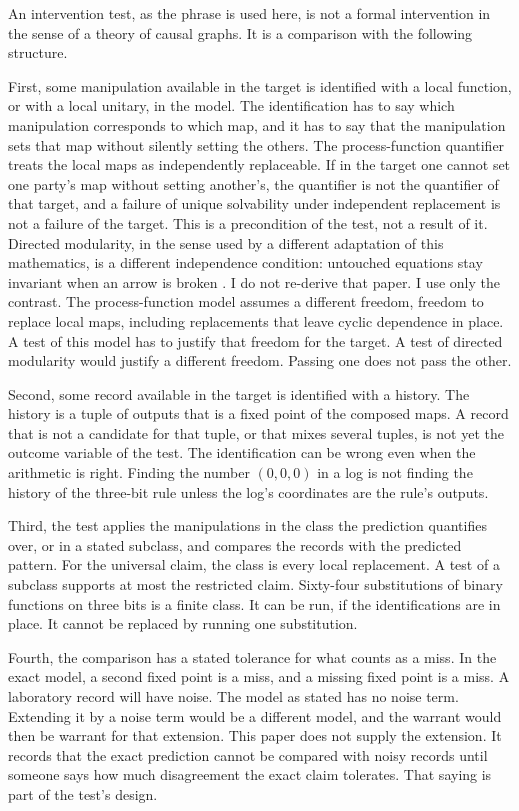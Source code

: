 \documentclass[11pt]{article}
\begin{document}
An intervention test, as the phrase is used here, is not a formal intervention in the sense of a theory of causal graphs. It is a comparison with the following structure.

First, some manipulation available in the target is identified with a local function, or with a local unitary, in the model. The identification has to say which manipulation corresponds to which map, and it has to say that the manipulation sets that map without silently setting the others. The process-function quantifier treats the local maps as independently replaceable. If in the target one cannot set one party's map without setting another's, the quantifier is not the quantifier of that target, and a failure of unique solvability under independent replacement is not a failure of the target. This is a precondition of the test, not a result of it. Directed modularity, in the sense used by a different adaptation of this mathematics, is a different independence condition: untouched equations stay invariant when an arrow is broken \citep{hausman1999}. I do not re-derive that paper. I use only the contrast. The process-function model assumes a different freedom, freedom to replace local maps, including replacements that leave cyclic dependence in place. A test of this model has to justify that freedom for the target. A test of directed modularity would justify a different freedom. Passing one does not pass the other.

Second, some record available in the target is identified with a history. The history is a tuple of outputs that is a fixed point of the composed maps. A record that is not a candidate for that tuple, or that mixes several tuples, is not yet the outcome variable of the test. The identification can be wrong even when the arithmetic is right. Finding the number \((0,0,0)\) in a log is not finding the history of the three-bit rule unless the log's coordinates are the rule's outputs.

Third, the test applies the manipulations in the class the prediction quantifies over, or in a stated subclass, and compares the records with the predicted pattern. For the universal claim, the class is every local replacement. A test of a subclass supports at most the restricted claim. Sixty-four substitutions of binary functions on three bits is a finite class. It can be run, if the identifications are in place. It cannot be replaced by running one substitution.

Fourth, the comparison has a stated tolerance for what counts as a miss. In the exact model, a second fixed point is a miss, and a missing fixed point is a miss. A laboratory record will have noise. The model as stated has no noise term. Extending it by a noise term would be a different model, and the warrant would then be warrant for that extension. This paper does not supply the extension. It records that the exact prediction cannot be compared with noisy records until someone says how much disagreement the exact claim tolerates. That saying is part of the test's design.
\end{document}
